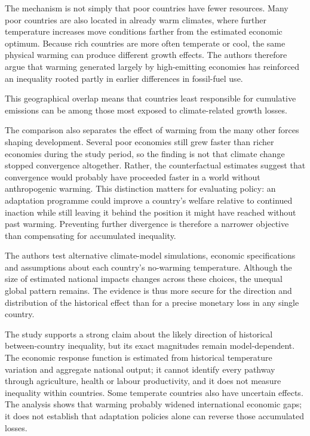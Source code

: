 \documentclass[11pt,a4paper]{article}
\begin{document}
\begin{extractbox}
The mechanism is not simply that poor countries have fewer resources. Many poor countries are also located in already warm climates, where further temperature increases move conditions farther from the estimated economic optimum. Because rich countries are more often temperate or cool, the same physical warming can produce different growth effects. The authors therefore argue that warming generated largely by high-emitting economies has reinforced an inequality rooted partly in earlier differences in fossil-fuel use.

This geographical overlap means that countries least responsible for cumulative emissions can be among those most exposed to climate-related growth losses.

The comparison also separates the effect of warming from the many other forces shaping development. Several poor economies still grew faster than richer economies during the study period, so the finding is not that climate change stopped convergence altogether. Rather, the counterfactual estimates suggest that convergence would probably have proceeded faster in a world without anthropogenic warming. This distinction matters for evaluating policy: an adaptation programme could improve a country's welfare relative to continued inaction while still leaving it behind the position it might have reached without past warming. Preventing further divergence is therefore a narrower objective than compensating for accumulated inequality.

The authors test alternative climate-model simulations, economic specifications and assumptions about each country's no-warming temperature. Although the size of estimated national impacts changes across these choices, the unequal global pattern remains. The evidence is thus more secure for the direction and distribution of the historical effect than for a precise monetary loss in any single country.

The study supports a strong claim about the likely direction of historical between-country inequality, but its exact magnitudes remain model-dependent. The economic response function is estimated from historical temperature variation and aggregate national output; it cannot identify every pathway through agriculture, health or labour productivity, and it does not measure inequality within countries. Some temperate countries also have uncertain effects. The analysis shows that warming probably widened international economic gaps; it does not establish that adaptation policies alone can reverse those accumulated losses.

\end{extractbox}
\end{document}
